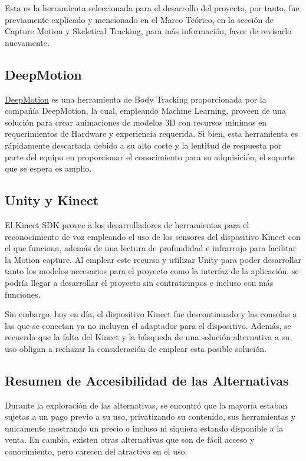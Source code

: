 Esta es la herramienta seleccionada para el desarrollo del proyecto, por tanto, fue previamente explicado y mencionado en el Marco Teórico, en la sección de Capture Motion y Skeletical Tracking, para más información, favor de revisarlo nuevamente.



\subsection{DeepMotion}
\href{https://deepmotion.com/3d-body-tracking}{DeepMotion} es una herramienta de Body Tracking proporcionada por la compañía DeepMotion, la cual, empleando Machine Learning, proveen de una solución para crear animaciones de modelos 3D con recursos mínimos en requerimientos de Hardware y experiencia requerida. Si bien, esta herramienta es rápidamente descartada debido a su alto coste y la lentitud de respuesta por parte del equipo en proporcionar el conocimiento para su adquisición, el soporte que se espera es amplio.

\subsection{Unity y Kinect}

El Kinect SDK provee a los desarrolladores de herramientas para el reconocimiento de voz empleando el uso de los sensores del dispositivo Kinect con el que funciona, además de una lectura de profundidad e infrarrojo para facilitar la Motion capture. Al emplear este recurso y utilizar Unity para poder desarrollar tanto los modelos necesarios para el proyecto como la interfaz de la aplicación, se podría llegar a desarrollar el proyecto sin contratiempos e incluso con más funciones.

Sin embargo, hoy en día, el dispositivo Kinect fue descontinuado y las consolas a las que se conectan ya no incluyen el adaptador para el dispositivo. Además, se recuerda que la falta del Kinect y la búsqueda de una solución alternativa a su uso obligan a rechazar la consideración de emplear esta posible solución.

\subsection{Resumen de Accesibilidad de las Alternativas}

Durante la exploración de las alternativas, se encontró que la mayoría estaban sujetas a un pago previo a su uso, privatizando su contenido, sus herramientas y unicamente mostrando un precio o incluso ni siquiera estando disponible a la venta. En cambio, existen otras alternativas que son de fácil acceso y conocimiento, pero carecen del atractivo en el uso. 

